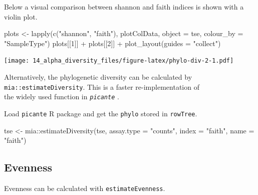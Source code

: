 \documentclass[
]{book}
\newenvironment{Shaded}{\begin{snugshade}}{\end{snugshade}}
\newcommand{\AttributeTok}[1]{\textcolor[rgb]{0.77,0.63,0.00}{#1}}
\newcommand{\DecValTok}[1]{\textcolor[rgb]{0.00,0.00,0.81}{#1}}
\newcommand{\FunctionTok}[1]{\textcolor[rgb]{0.00,0.00,0.00}{#1}}
\newcommand{\NormalTok}[1]{#1}
\newcommand{\OtherTok}[1]{\textcolor[rgb]{0.56,0.35,0.01}{#1}}
\newcommand{\SpecialCharTok}[1]{\textcolor[rgb]{0.00,0.00,0.00}{#1}}
\newcommand{\StringTok}[1]{\textcolor[rgb]{0.31,0.60,0.02}{#1}}
\begin{document}
Below a visual comparison between shannon and faith indices is shown with a violin plot.

\begin{Shaded}
\begin{Highlighting}[]
\NormalTok{plots }\OtherTok{\textless{}{-}} \FunctionTok{lapply}\NormalTok{(}\FunctionTok{c}\NormalTok{(}\StringTok{"shannon"}\NormalTok{, }\StringTok{"faith"}\NormalTok{),}
\NormalTok{                plotColData,}
                \AttributeTok{object =}\NormalTok{ tse, }\AttributeTok{colour\_by =} \StringTok{"SampleType"}\NormalTok{)}
\NormalTok{plots[[}\DecValTok{1}\NormalTok{]] }\SpecialCharTok{+}\NormalTok{ plots[[}\DecValTok{2}\NormalTok{]] }\SpecialCharTok{+}
  \FunctionTok{plot\_layout}\NormalTok{(}\AttributeTok{guides =} \StringTok{"collect"}\NormalTok{)}
\end{Highlighting}
\end{Shaded}

\texttt{[image: 14\_alpha\_diversity\_files/figure-latex/phylo-div-2-1.pdf]}

Alternatively, the phylogenetic diversity can be calculated by \texttt{mia::estimateDiversity}. This is a faster re-implementation of\\
the widely used function in \emph{\texttt{picante}} \citep[\citet{Kembel2010}]{R-picante}.

Load \texttt{picante} R package and get the \texttt{phylo} stored in \texttt{rowTree}.

\begin{Shaded}
\begin{Highlighting}[]
\NormalTok{tse }\OtherTok{\textless{}{-}}\NormalTok{ mia}\SpecialCharTok{::}\FunctionTok{estimateDiversity}\NormalTok{(tse, }
                              \AttributeTok{assay.type =} \StringTok{"counts"}\NormalTok{,}
                              \AttributeTok{index =} \StringTok{"faith"}\NormalTok{, }
                              \AttributeTok{name =} \StringTok{"faith"}\NormalTok{)}
\end{Highlighting}
\end{Shaded}

\hypertarget{evenness}{%
\subsection{Evenness}\label{evenness}}

Evenness can be calculated with \texttt{estimateEvenness}.

\begin{Shaded}
\end{Shaded}
\end{document}
